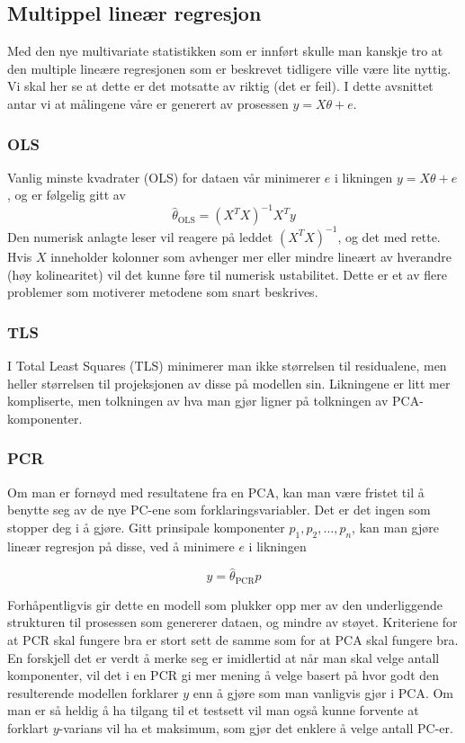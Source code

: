 \subsection{Multippel lineær regresjon}
Med den nye multivariate statistikken som er innført skulle man kanskje tro at den multiple lineære regresjonen som er beskrevet tidligere ville være lite nyttig. Vi skal her se at dette er det motsatte av riktig (det er feil). I dette avsnittet antar vi at målingene våre er generert av prosessen $y = X \theta + e$.

\subsubsection{OLS}
Vanlig minste kvadrater (OLS) for dataen vår minimerer $e$ i likningen $y = X \theta + e$, og er følgelig gitt av
\begin{equation}
	\hat{\theta}_{\textrm{OLS}} = (X^T X)^{-1} X^T y
\end{equation}
Den numerisk anlagte leser vil reagere på leddet $(X^T X)^{-1}$, og det med rette. Hvis $X$ inneholder kolonner som avhenger mer eller mindre lineært av hverandre (høy kolinearitet) vil det kunne føre til numerisk ustabilitet. Dette er et av flere problemer som motiverer metodene som snart beskrives.

\subsubsection{TLS}
I Total Least Squares (TLS) minimerer man ikke størrelsen til residualene, men heller størrelsen til projeksjonen av disse på modellen sin. Likningene er litt mer kompliserte, men tolkningen av hva man gjør ligner på tolkningen av PCA-komponenter.

\subsubsection{PCR}
Om man er fornøyd med resultatene fra en PCA, kan man være fristet til å benytte seg av de nye PC-ene som forklaringsvariabler. Det er det ingen som stopper deg i å gjøre. Gitt prinsipale komponenter $p_1, p_2, \dots, p_n$, kan man gjøre lineær regresjon på disse, ved å minimere $e$ i likningen

\begin{equation}
	y = \hat{\theta}_{\textrm{PCR}} p
\end{equation}

Forhåpentligvis gir dette en modell som plukker opp mer av den underliggende strukturen til prosessen som genererer dataen, og mindre av støyet. Kriteriene for at PCR skal fungere bra er stort sett de samme som for at PCA skal fungere bra. En forskjell det er verdt å merke seg er imidlertid at når man skal velge antall komponenter, vil det i en PCR gi mer mening å velge basert på hvor godt den resulterende modellen forklarer $y$ enn å gjøre som man vanligvis gjør i PCA. Om man er så heldig å ha tilgang til et testsett vil man også kunne forvente at forklart $y$-varians vil ha et maksimum, som gjør det enklere å velge antall PC-er.

